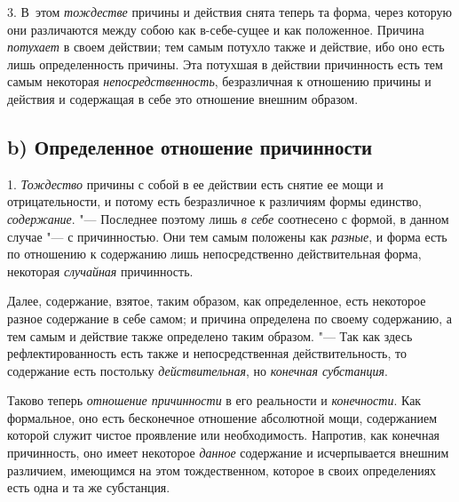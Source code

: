 3. В~этом {\em тождестве} причины и действия снята
теперь та форма, через которую они различаются между собою как в-себе-сущее
и как положенное. Причина {\em потухает} в своем
действии; тем самым потухло также и действие, ибо оно есть лишь
определенность причины. Эта потухшая в действии причинность есть тем самым
некоторая {\em непосредственность}, безразличная к
отношению причины и действия и содержащая в себе это отношение внешним
образом.


\subsection[b) Определенное отношение причинности]{b) Определенное отношение причинности}

1. {\em Тождество} причины с
собой в ее действии есть снятие ее мощи и отрицательности, и потому есть
безразличное к различиям формы единство,
{\em содержание}. "--- Последнее поэтому лишь
{\em в себе} соотнесено с формой, в данном случае "--- с
причинностью. Они тем самым положены как {\em разные},
и форма есть по отношению к содержанию лишь непосредственно действительная
форма, некоторая {\em случайная} причинность.

Далее, содержание, взятое, таким образом, как определенное, есть некоторое
разное содержание в себе самом; и причина определена по своему содержанию,
а тем самым и действие также определено таким образом. "--- Так как здесь
рефлектированность есть также и непосредственная действительность, то
содержание есть постольку {\em действительная}, но {\em конечная субстанция}.

Таково теперь {\em отношение причинности} в его
реальности и {\em конечности}. Как формальное, оно есть
бесконечное отношение абсолютной мощи, содержанием которой служит чистое
проявление или необходимость. Напротив, как конечная причинность, оно имеет
некоторое {\em данное} содержание и исчерпывается
внешним различием, имеющимся на этом тождественном, которое в своих
определениях есть одна и та же субстанция.

